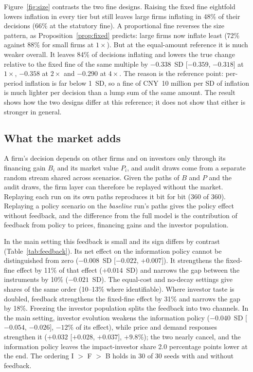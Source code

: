 \documentclass[11pt]{article}
\begin{document}
Figure~\ref{fig:size} contrasts the two fine designs. Raising the fixed fine eightfold lowers inflation in every tier but still leaves large firms inflating in 48\% of their decisions (66\% at the statutory fine). A proportional fine reverses the size pattern, as Proposition~\ref{prop:fixed} predicts: large firms now inflate least (72\% against 88\% for small firms at $1\times$). But at the equal-amount reference it is much weaker overall. It leaves 84\% of decisions inflating and lowers the true change relative to the fixed fine of the same multiple by $-0.338$~SD [$-0.359$, $-0.318$] at $1\times$, $-0.358$ at $2\times$ and $-0.290$ at $4\times$. The reason is the reference point: per-period inflation is far below 1~SD, so a fine of CNY~10 million per SD of inflation is much lighter per decision than a lump sum of the same amount. The result shows how the two designs differ at this reference; it does not show that either is stronger in general.

\subsection{What the market adds}\label{sec:feedback}

A firm's decision depends on other firms and on investors only through its financing gain $B_i$ and its market value $P_i$, and audit draws come from a separate random stream shared across scenarios. Given the paths of $B$ and $P$ and the audit draws, the firm layer can therefore be replayed without the market. Replaying each run on its own paths reproduces it bit for bit (360 of 360). Replaying a policy scenario on the \emph{baseline} run's paths gives the policy effect without feedback, and the difference from the full model is the contribution of feedback from policy to prices, financing gains and the investor population.

In the main setting this feedback is small and its sign differs by contrast (Table~\ref{tab:feedback}). Its net effect on the information policy cannot be distinguished from zero ($-0.008$~SD [$-0.022$, $+0.007$]). It strengthens the fixed-fine effect by 11\% of that effect ($+0.014$~SD) and narrows the gap between the instruments by 10\% ($-0.021$~SD). The equal-cost and no-decay settings give shares of the same order (10--13\% where identifiable). Where investor taste is doubled, feedback strengthens the fixed-fine effect by 31\% and narrows the gap by 18\%. Freezing the investor population splits the feedback into two channels. In the main setting, investor evolution weakens the information policy ($-0.040$~SD [$-0.054$, $-0.026$], $-12\%$ of its effect), while price and demand responses strengthen it ($+0.032$ [$+0.028$, $+0.037$], $+9.8\%$); the two nearly cancel, and the information policy leaves the impact-investor share 2.0 percentage points lower at the end. The ordering I $>$ F $>$ B holds in 30 of 30 seeds with and without feedback.
\end{document}
